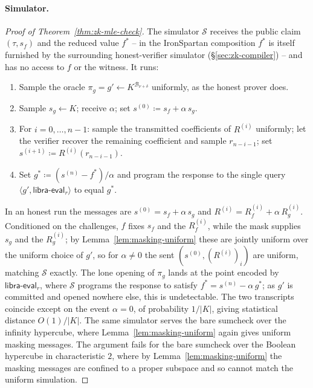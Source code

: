 \documentclass{article}
\theoremstyle{definition}
\newcommand{\BB}{\mathcal{B}}
\begin{document}
\paragraph{Simulator.}
\begin{proof}[Proof of Theorem~\ref{thm:zk-mle-check}]
The simulator $\mathcal{S}$ receives the public claim $(\tau, s_f)$ and the reduced value $f^*$ -- in the IronSpartan composition $f^*$ is itself furnished by the surrounding honest-verifier simulator (\S\ref{sec:zk-compiler}) -- and has no access to $f$ or the witness. It runs:
\begin{enumerate}
\item Sample the oracle $\pi_g = g' \gets K^{\BB_{\nu + \delta}}$ uniformly, as the honest prover does.
\item Sample $s_g \gets K$; receive $\alpha$; set $s^{(0)} \coloneqq s_f + \alpha\, s_g$.
\item For $i = 0, \ldots, n - 1$: sample the transmitted coefficients of $R^{(i)}$ uniformly; let the verifier recover the remaining coefficient and sample $r_{n - i - 1}$; set $s^{(i + 1)} \coloneqq R^{(i)}(r_{n - i - 1})$.
\item Set $g^* \coloneqq (s^{(n)} - f^*)/\alpha$ and program the response to the single query $\langle g', \textsf{libra-eval}_r \rangle$ to equal $g^*$.
\end{enumerate}
In an honest run the messages are $s^{(0)} = s_f + \alpha\, s_g$ and $R^{(i)} = R_f^{(i)} + \alpha\, R_g^{(i)}$. Conditioned on the challenges, $f$ fixes $s_f$ and the $R_f^{(i)}$, while the mask supplies $s_g$ and the $R_g^{(i)}$; by Lemma~\ref{lem:masking-uniform} these are jointly uniform over the uniform choice of $g'$, so for $\alpha \neq 0$ the sent $(s^{(0)}, (R^{(i)})_i)$ are uniform, matching $\mathcal{S}$ exactly. The lone opening of $\pi_g$ lands at the point encoded by $\textsf{libra-eval}_r$, where $\mathcal{S}$ programs the response to satisfy $f^* = s^{(n)} - \alpha\, g^*$; as $g'$ is committed and opened nowhere else, this is undetectable. The two transcripts coincide except on the event $\alpha = 0$, of probability $1/|K|$, giving statistical distance $O(1)/|K|$. The same simulator serves the bare sumcheck over the infinity hypercube, where Lemma~\ref{lem:masking-uniform} again gives uniform masking messages. The argument fails for the bare sumcheck over the Boolean hypercube in characteristic $2$, where by Lemma~\ref{lem:masking-uniform} the masking messages are confined to a proper subspace and so cannot match the uniform simulation.
\end{proof}

\printbibliography
\end{document}
